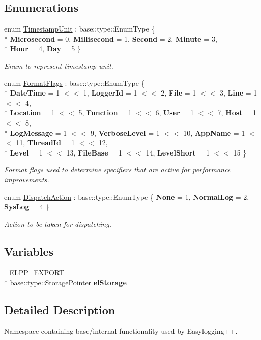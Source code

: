 \subsection*{Enumerations}
\begin{DoxyCompactItemize}
\item 
enum \hyperlink{namespaceel_1_1base_a1b886858c6409097395b24b1bdf03c39}{Timestamp\-Unit} \-: base\-::type\-::\-Enum\-Type \{ \\*
{\bfseries Microsecond} = 0, 
{\bfseries Millisecond} = 1, 
{\bfseries Second} = 2, 
{\bfseries Minute} = 3, 
\\*
{\bfseries Hour} = 4, 
{\bfseries Day} = 5
 \}
\begin{DoxyCompactList}\small\item\em Enum to represent timestamp unit. \end{DoxyCompactList}\item 
enum \hyperlink{namespaceel_1_1base_a28939c5a884e67fcf12259f4b8848e00}{Format\-Flags} \-: base\-::type\-::\-Enum\-Type \{ \\*
{\bfseries Date\-Time} = 1 $<$$<$ 1, 
{\bfseries Logger\-Id} = 1 $<$$<$ 2, 
{\bfseries File} = 1 $<$$<$ 3, 
{\bfseries Line} = 1 $<$$<$ 4, 
\\*
{\bfseries Location} = 1 $<$$<$ 5, 
{\bfseries Function} = 1 $<$$<$ 6, 
{\bfseries User} = 1 $<$$<$ 7, 
{\bfseries Host} = 1 $<$$<$ 8, 
\\*
{\bfseries Log\-Message} = 1 $<$$<$ 9, 
{\bfseries Verbose\-Level} = 1 $<$$<$ 10, 
{\bfseries App\-Name} = 1 $<$$<$ 11, 
{\bfseries Thread\-Id} = 1 $<$$<$ 12, 
\\*
{\bfseries Level} = 1 $<$$<$ 13, 
{\bfseries File\-Base} = 1 $<$$<$ 14, 
{\bfseries Level\-Short} = 1 $<$$<$ 15
 \}
\begin{DoxyCompactList}\small\item\em Format flags used to determine specifiers that are active for performance improvements. \end{DoxyCompactList}\item 
enum \hyperlink{namespaceel_1_1base_a3aa2563d38e47388ba242a1694fc2839}{Dispatch\-Action} \-: base\-::type\-::\-Enum\-Type \{ {\bfseries None} = 1, 
{\bfseries Normal\-Log} = 2, 
{\bfseries Sys\-Log} = 4
 \}
\begin{DoxyCompactList}\small\item\em Action to be taken for dispatching. \end{DoxyCompactList}\end{DoxyCompactItemize}
\subsection*{Variables}
\begin{DoxyCompactItemize}
\item 
\hypertarget{namespaceel_1_1base_a30cc63a5c0a00c77e5c7a639500e6e85}{\-\_\-\-E\-L\-P\-P\-\_\-\-E\-X\-P\-O\-R\-T \\*
base\-::type\-::\-Storage\-Pointer {\bfseries el\-Storage}}\label{namespaceel_1_1base_a30cc63a5c0a00c77e5c7a639500e6e85}

\end{DoxyCompactItemize}


\subsection{Detailed Description}
Namespace containing base/internal functionality used by Easylogging++. 